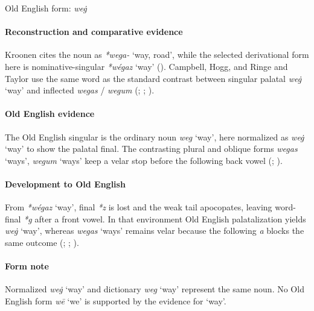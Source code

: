 \documentclass[
  british,
  a4paper,
]{article}
\providecommand{\Recon}[1]{\emph{*#1}}
\begin{document}
Old English form: \emph{weġ}

\paragraph{Reconstruction and comparative
evidence}\label{reconstruction-and-comparative-evidence-74}

Kroonen cites the noun as \emph{*wega-} `way, road', while the selected
derivational form here is nominative-singular \Recon{wégaz} `way'
(). Campbell, Hogg, and Ringe
and Taylor use the same word as the standard contrast between singular
palatal \emph{weġ} `way' and inflected \emph{wegas} / \emph{wegum}
(;
;
).

\paragraph{Old English evidence}\label{old-english-evidence-76}

The Old English singular is the ordinary noun \emph{weg} `way', here
normalized as \emph{weġ} `way' to show the palatal final. The
contrasting plural and oblique forms \emph{wegas} `ways', \emph{wegum}
`ways' keep a velar stop before the following back vowel
(;
).

\paragraph{Development to Old
English}\label{development-to-old-english-75}

From \Recon{wégaz} `way', final \emph{*z} is lost and the weak tail
apocopates, leaving word-final \emph{*g} after a front vowel. In that
environment Old English palatalization yields \emph{weġ} `way', whereas
\emph{wegas} `ways' remains velar because the following \emph{a} blocks
the same outcome (;
;
).

\paragraph{Form note}\label{form-note-24}

Normalized \emph{weġ} `way' and dictionary \emph{weg} `way' represent
the same noun. No Old English form \emph{wē} `we' is supported by the
evidence for `way'.
\end{document}
